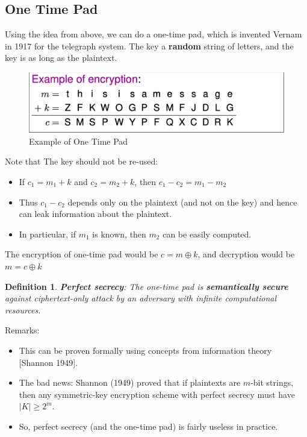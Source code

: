 \documentclass[12pt,titlepage]{article}
\newtheorem{protodefinition}[prototheorem]{Definition}
\newenvironment{definition}
{\colorlet{shadecolor}{cyan!15}\begin{shaded}\begin{protodefinition}\normalfont}{\end{protodefinition}\end{shaded}}
\begin{document}
\subsection{One Time Pad}
Using the idea from above, we can do a one-time pad, which is invented Vernam in 1917 for the telegraph system. The key a \textbf{random} string of letters, and the key is as long as the plaintext.
\begin{center}
	\begin{figure}[h!]
		\includegraphics[width=\textwidth]{one_time_pad.png}
		\caption{Example of One Time Pad}
	\end{figure}
\end{center}

Note that The key should not be re-used: \begin{itemize}
\item If $c_1 = m_1 +k$ and $c_2 = m_2 +k$, then $c_1 -c_2 = m_1 -m_2$
\item Thus $c_1 -c_2$ depends only on the plaintext (and not on the key) and hence can leak information about the plaintext.
\item In particular, if $m_1$ is known, then $m_2$ can be easily computed.
\end{itemize}
The encryption of one-time pad would be $c = m \oplus k$, and decryption would be $m = c \oplus k$

\begin{definition}
	\textbf{Perfect secrecy}: The one-time pad is \textbf{semantically secure} against ciphertext-only attack by an adversary with infinite computational resources.
\end{definition}

Remarks: \begin{itemize}
\item This can be proven formally using concepts from information theory [Shannon 1949].
\item The bad news: Shannon (1949) proved that if plaintexts are $m$-bit strings, then any symmetric-key encryption scheme with perfect secrecy must have $|K| \geq 2^m$.
\item So, perfect secrecy (and the one-time pad) is fairly useless in practice.
\end{itemize}
\end{document}
